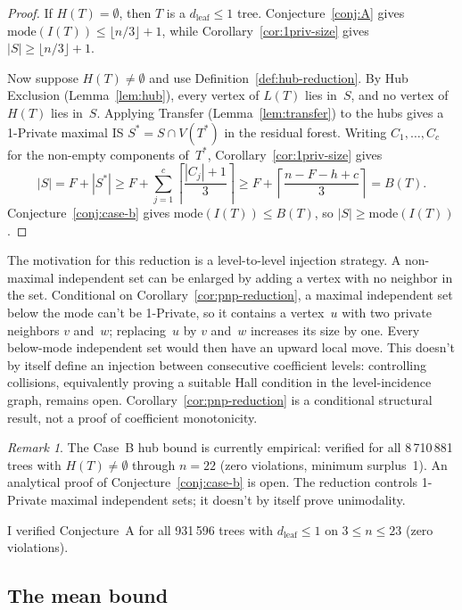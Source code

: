 \documentclass[12pt,oneside]{article}
\theoremstyle{remark}
\newtheorem{remark}[theorem]{Remark}
\newcommand{\dleaf}{d_{\mathrm{leaf}}}    %
\begin{document}
\begin{proof}
If $H(T)=\emptyset$, then $T$ is a $\dleaf\le 1$ tree.
Conjecture~\ref{conj:A} gives $\mathrm{mode}(I(T))\le \lfloor n/3\rfloor+1$, while Corollary~\ref{cor:1priv-size} gives $|S|\ge \lfloor n/3\rfloor+1$.

Now suppose $H(T)\ne\emptyset$ and use Definition~\ref{def:hub-reduction}.
By Hub Exclusion (Lemma~\ref{lem:hub}), every vertex of $L(T)$ lies in~$S$, and no vertex of $H(T)$ lies in~$S$.
Applying Transfer (Lemma~\ref{lem:transfer}) to the hubs gives a 1-Private maximal IS $S^*=S\cap V(T^*)$ in the residual forest.
Writing $C_1,\ldots,C_c$ for the non-empty components of~$T^*$, Corollary~\ref{cor:1priv-size} gives
\[
  |S|
  =F+|S^*|
  \ge
  F+\sum_{j=1}^c\left\lceil\frac{|C_j|+1}{3}\right\rceil
  \ge
  F+\left\lceil\frac{n-F-h+c}{3}\right\rceil
  =B(T).
\]
Conjecture~\ref{conj:case-b} gives $\mathrm{mode}(I(T))\le B(T)$, so $|S|\ge \mathrm{mode}(I(T))$.
\end{proof}

The motivation for this reduction is a level-to-level injection strategy.
A non-maximal independent set can be enlarged by adding a vertex with no neighbor in the set.
Conditional on Corollary~\ref{cor:pnp-reduction}, a maximal independent set below the mode can't be 1-Private, so it contains a vertex~$u$ with two private neighbors $v$ and~$w$; replacing~$u$ by $v$ and~$w$ increases its size by one.
Every below-mode independent set would then have an upward local move.
This doesn't by itself define an injection between consecutive coefficient levels: controlling collisions, equivalently proving a suitable Hall condition in the level-incidence graph, remains open.
Corollary~\ref{cor:pnp-reduction} is a conditional structural result, not a proof of coefficient monotonicity.

\begin{remark}
The Case~B hub bound is currently empirical: verified for all 8\,710\,881 trees with $H(T)\ne\emptyset$ through $n = 22$ (zero violations, minimum surplus~1).
An analytical proof of Conjecture~\ref{conj:case-b} is open.
The reduction controls 1-Private maximal independent sets; it doesn't by itself prove unimodality.
\end{remark}

I verified Conjecture~A for all 931\,596 trees with $\dleaf \le 1$ on $3\le n\le23$ (zero violations).

\subsection{The mean bound}\label{subsec:mean}
\end{document}
